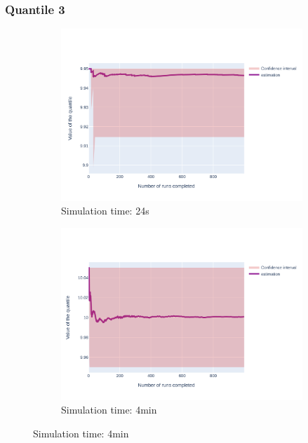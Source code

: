 \documentclass{article}
\begin{document}
\subsubsection{Quantile 3}
\begin{figure}[H]
    \centering
    \begin{subfigure}{.495\textwidth}
        \centering
        \includegraphics[width=\textwidth]{../fig/quantile3/VD2_24s.png}
        \caption{Simulation time: 24s}
        \vspace{.5cm}
    \end{subfigure}
    \begin{subfigure}{.495\textwidth}
        \centering
        \includegraphics[width=\textwidth]{../fig/quantile3/VD2_4mn.png}
        \caption{Simulation time: 4min}
        \vspace{.5cm}

\end{subfigure}
\end{figure}
\end{document}
